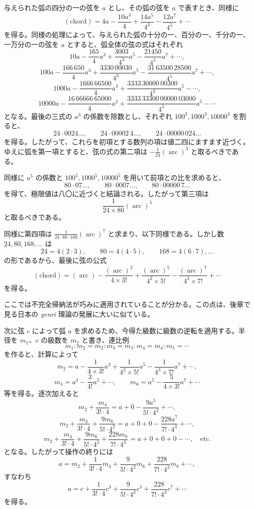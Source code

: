 \documentclass[11pt]{article}
\newcommand{\scanpage}[2]{\clearpage\setcounter{footnote}{0}\noindent{\footnotesize\color{gray}PDF #1 頁 · #2}\par\medskip}
\newcommand{\scanfooter}{}
\newcommand{\arcop}{\mathop{\mathrm{arc}}}
\begin{document}
与えられた弧の四分の一の弦を $a$ とし、その弧の弦を $a$ で表すとき、同様に
\[
(\mathrm{chord})=4a-\frac{10a^3}{4}+\frac{14a^5}{4^3}-\frac{12a^7}{4^5}+\cdots
\]
を得る。同様の処理によって、与えられた弧の十分の一、百分の一、千分の一、一万分の一の弦を $a$ とすると、弧全体の弦の式はそれぞれ
\[
10a-\frac{165}{4}a^3+\frac{3003}{4^3}a^5-\frac{21450}{4^5}a^7+\cdots,
\]
\[
100a-\frac{166\,650}{4}a^3+\frac{3330\,00030}{4^3}a^5-\frac{31\,63500\,28500}{4^5}a^7+\cdots,
\]
\[
1000a-\frac{1666\,66500}{4}a^3+\frac{3333\,30000\,00300}{4^3}a^5-\cdots,
\]
\[
10000a-\frac{16\,66666\,65000}{4}a^3+\frac{3333\,33300\,00000\,03000}{4^3}a^5-\cdots
\]
となる。最後の三式の $a^3$ の係数を除数とし、それぞれ $100^3,1000^3,10000^3$ を割ると、
\[
24\cdot0024\ldots,
\qquad 24\cdot00002\,4\ldots,
\qquad 24\cdot00000\,024\ldots
\]
を得る。したがって、これらを初項とする数列の項は値二四にますます近づく。ゆえに弧を第一項とすると、弦の式の第二項は $-\frac1{24}(\arcop)^3$ と取るべきである。

同様に $a^5$ の係数と $100^5,1000^5,10000^5$ を用いて前項との比を求めると、
\[
80\cdot07\ldots,
\qquad 80\cdot0007\ldots,
\qquad 80\cdot00000\,7\ldots
\]
を得て、極限値は八〇に近づくと結論される。したがって第三項は
\[
\frac1{24\times80}(\arcop)^5
\]
と取るべきである。
\scanfooter

\scanpage{0162}{第21章、印刷頁148}
同様に第四項は $\frac1{24\cdot80\cdot168}(\arcop)^7$ と求まり、以下同様である。しかし数 $24,80,168,\ldots$ は
\[
24=4(2\cdot3),\qquad 80=4(4\cdot5),\qquad 168=4(6\cdot7),\ldots
\]
の形であるから、最後に弦の公式
\[
(\mathrm{chord})=(\arcop)-\frac{(\arcop)^3}{4\times3!}+\frac{(\arcop)^5}{4^2\times5!}-\frac{(\arcop)^7}{4^3\times7!}+\cdots
\]
を得る。

ここでは不完全帰納法が巧みに適用されていることが分かる。この点は、後章で見る日本の \emph{yenri} 理論の発展に大いに似ている。

次に弦 $c$ によって弧 $a$ を求めるため、今得た級数に級数の逆転を適用する。半径を $m_1$、$c$ の級数を $m_2$ と書き、連比例
\[
m_1:m_2=m_2:m_3=m_3:m_4=m_4:m_5=\cdots
\]
を作ると、計算によって
\[
m_2=a-\frac1{4\times3!}a^3+\frac1{4^2\times5!}a^5-\frac1{4^3\times7!}a^7+\cdots,
\]
\[
m_4=a^3-\frac3{4!}a^5+\cdots,
\qquad
m_6=a^5-\frac5{4\times3!}a^7+\cdots
\]
等を得る。逐次加えると
\[
m_2+\frac{m_4}{3!\cdot4}=a+0-\frac{9a^5}{5!\cdot4^2}+\cdots,
\]
\[
m_2+\frac{m_4}{3!\cdot4}+\frac{9m_6}{5!\cdot4^2}=a+0+0-\frac{228a^7}{7!\cdot4^3}+\cdots,
\]
\[
m_2+\frac{m_4}{3!\cdot4}+\frac{9m_6}{5!\cdot4^2}+\frac{228m_8}{7!\cdot4^3}=a+0+0+0-\cdots,\quad\mathrm{etc.}
\]
となる。したがって操作の終りには
\[
a=m_2+\frac1{3!\cdot4}m_4+\frac9{5!\cdot4^2}m_6+\frac{228}{7!\cdot4^3}m_8+\cdots,
\]
すなわち
\[
a=c+\frac1{3!\cdot4}c^3+\frac9{5!\cdot4^2}c^5+\frac{228}{7!\cdot4^3}c^7+\cdots
\]
を得る。
\end{document}
